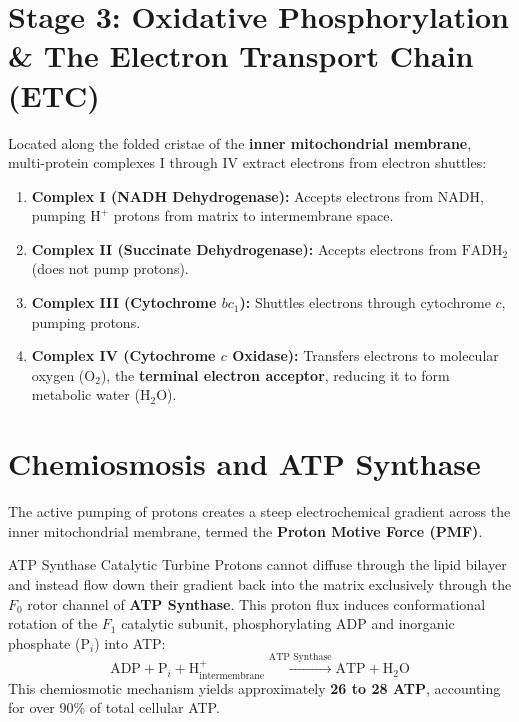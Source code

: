 \documentclass[11pt,a4paper]{article}
\begin{document}
\vspace{10pt}

\section{Stage 3: Oxidative Phosphorylation \& The Electron Transport Chain (ETC)}

Located along the folded cristae of the \textbf{inner mitochondrial membrane}, multi-protein complexes I through IV extract electrons from electron shuttles:
\begin{enumerate}[leftmargin=1.5em, itemsep=3pt]
    \item \textbf{Complex I (NADH Dehydrogenase):} Accepts electrons from NADH, pumping $\text{H}^+$ protons from matrix to intermembrane space.
    \item \textbf{Complex II (Succinate Dehydrogenase):} Accepts electrons from $\text{FADH}_2$ (does not pump protons).
    \item \textbf{Complex III (Cytochrome $bc_1$):} Shuttles electrons through cytochrome $c$, pumping protons.
    \item \textbf{Complex IV (Cytochrome $c$ Oxidase):} Transfers electrons to molecular oxygen ($\text{O}_2$), the \textbf{terminal electron acceptor}, reducing it to form metabolic water ($\text{H}_2\text{O}$).
\end{enumerate}

\vspace{10pt}

\section{Chemiosmosis and ATP Synthase}

The active pumping of protons creates a steep electrochemical gradient across the inner mitochondrial membrane, termed the \textbf{Proton Motive Force (PMF)}.

\begin{biobox}{ATP Synthase Catalytic Turbine}
Protons cannot diffuse through the lipid bilayer and instead flow down their gradient back into the matrix exclusively through the $F_0$ rotor channel of \textbf{ATP Synthase}. This proton flux induces conformational rotation of the $F_1$ catalytic subunit, phosphorylating ADP and inorganic phosphate ($\text{P}_i$) into ATP:
\begin{equation*}
    \text{ADP} + \text{P}_i + \text{H}^+_{\text{intermembrane}} \xrightarrow{\text{ATP Synthase}} \text{ATP} + \text{H}_2\text{O}
\end{equation*}
This chemiosmotic mechanism yields approximately \textbf{26 to 28 ATP}, accounting for over 90\% of total cellular ATP.
\end{biobox}
\end{document}
